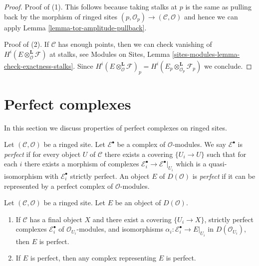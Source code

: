 \begin{proof}
Proof of (1). This follows because taking stalks at $p$ is
the same as pulling back by the morphism of ringed sites
$(p, \mathcal{O}_p) \to (\mathcal{C}, \mathcal{O})$ and hence
we can apply Lemma \ref{lemma-tor-amplitude-pullback}.

\medskip\noindent
Proof of (2). If $\mathcal{C}$ has enough points, then we can check
vanishing of
$H^i(E \otimes_\mathcal{O}^\mathbf{L} \mathcal{F})$
at stalks, see
Modules on Sites, Lemma \ref{sites-modules-lemma-check-exactness-stalks}.
Since $H^i(E \otimes_\mathcal{O}^\mathbf{L} \mathcal{F})_p =
H^i(E_p \otimes_{\mathcal{O}_p}^\mathbf{L} \mathcal{F}_p)$ we conclude.
\end{proof}










\section{Perfect complexes}
\label{section-perfect}

\noindent
In this section we discuss properties of perfect complexes on
ringed sites.

\begin{definition}
\label{definition-perfect}
Let $(\mathcal{C}, \mathcal{O})$ be a ringed site.
Let $\mathcal{E}^\bullet$ be a complex of $\mathcal{O}$-modules.
We say $\mathcal{E}^\bullet$ is {\it perfect} if for every object $U$ of
$\mathcal{C}$ there exists a covering $\{U_i \to U\}$ such that for each $i$
there exists a morphism of complexes
$\mathcal{E}_i^\bullet \to \mathcal{E}^\bullet|_{U_i}$
which is a quasi-isomorphism with $\mathcal{E}_i^\bullet$
strictly perfect.
An object $E$ of $D(\mathcal{O})$ is {\it perfect}
if it can be represented by a perfect complex of $\mathcal{O}$-modules.
\end{definition}

\begin{lemma}
\label{lemma-perfect-independent-representative}
Let $(\mathcal{C}, \mathcal{O})$ be a ringed site.
Let $E$ be an object of $D(\mathcal{O})$.
\begin{enumerate}
\item If $\mathcal{C}$ has a final object $X$ and there exist a
covering $\{U_i \to X\}$, strictly perfect complexes $\mathcal{E}_i^\bullet$
of $\mathcal{O}_{U_i}$-modules, and isomorphisms
 $\alpha_i : \mathcal{E}_i^\bullet \to E|_{U_i}$ in
$D(\mathcal{O}_{U_i})$, then $E$ is perfect.
\item If $E$ is perfect, then any complex representing $E$ is perfect.
\end{enumerate}
\end{lemma}

